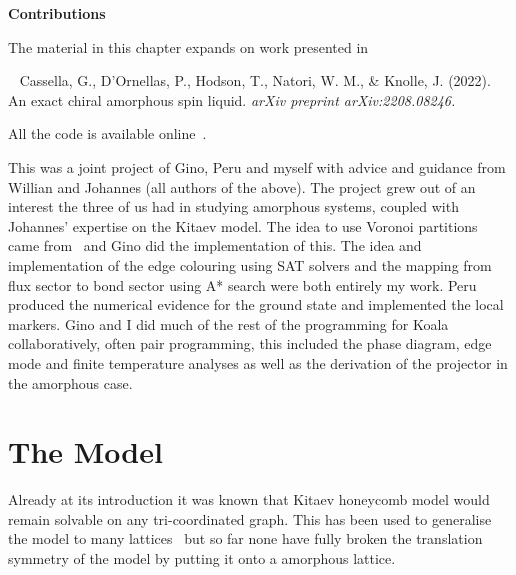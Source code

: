 \textbf{Contributions}

The material in this chapter expands on work presented in

~\autocite{cassellaExactChiralAmorphous2022} Cassella, G., D'Ornellas, P., Hodson, T., Natori, W. M., \& Knolle, J. (2022). An exact chiral amorphous spin liquid. \emph{arXiv preprint arXiv:2208.08246.}

All the code is available online~\autocite{hodsonKoalaKitaevAmorphous2022}.

This was a joint project of Gino, Peru and myself with advice and guidance from Willian and Johannes (all authors of the above). The project grew out of an interest the three of us had in studying amorphous systems, coupled with Johannes' expertise on the Kitaev model. The idea to use Voronoi partitions came from~\autocite{marsalTopologicalWeaireThorpe2020} and Gino did the implementation of this. The idea and implementation of the edge colouring using SAT solvers and the mapping from flux sector to bond sector using A* search were both entirely my work. Peru produced the numerical evidence for the ground state and implemented the local markers. Gino and I did much of the rest of the programming for Koala collaboratively, often pair programming, this included the phase diagram, edge mode and finite temperature analyses as well as the derivation of the projector in the amorphous case.

\hypertarget{amk-Model}{%
\section{The Model}\label{amk-Model}}

Already at its introduction it was known that Kitaev honeycomb model would remain solvable on any tri-coordinated graph. This has been used to generalise the model to many lattices~\autocite{eschmannThermodynamicClassificationThreedimensional2020,Yao2009,eschmann2019thermodynamics,Peri2020} but so far none have fully broken the translation symmetry of the model by putting it onto a amorphous lattice.

